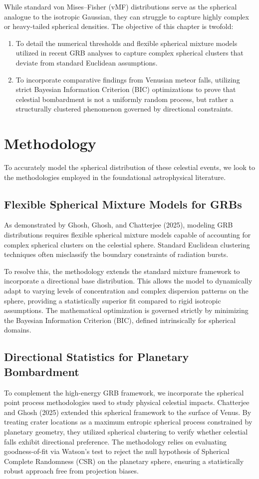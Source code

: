 \documentclass[12pt,a4paper]{report}
\begin{document}
While standard von Mises–Fisher (vMF) distributions serve as the spherical analogue to the isotropic Gaussian, they can struggle to capture highly complex or heavy-tailed spherical densities. The objective of this chapter is twofold:
\begin{enumerate}
    \item To detail the numerical thresholds and flexible spherical mixture models utilized in recent GRB analyses to capture complex spherical clusters that deviate from standard Euclidean assumptions.
    \item To incorporate comparative findings from Venusian meteor falls, utilizing strict Bayesian Information Criterion (BIC) optimizations to prove that celestial bombardment is not a uniformly random process, but rather a structurally clustered phenomenon governed by directional constraints.
\end{enumerate}

\section{Methodology}
To accurately model the spherical distribution of these celestial events, we look to the methodologies employed in the foundational astrophysical literature.

\subsection{Flexible Spherical Mixture Models for GRBs}
As demonstrated by Ghosh, Ghosh, and Chatterjee (2025), modeling GRB distributions requires flexible spherical mixture models capable of accounting for complex spherical clusters on the celestial sphere. Standard Euclidean clustering techniques often misclassify the boundary constraints of radiation bursts. 

To resolve this, the methodology extends the standard mixture framework to incorporate a directional base distribution. This allows the model to dynamically adapt to varying levels of concentration and complex dispersion patterns on the sphere, providing a statistically superior fit compared to rigid isotropic assumptions. The mathematical optimization is governed strictly by minimizing the Bayesian Information Criterion (BIC), defined intrinsically for spherical domains.

\subsection{Directional Statistics for Planetary Bombardment}
To complement the high-energy GRB framework, we incorporate the spherical point process methodologies used to study physical celestial impacts. Chatterjee and Ghosh (2025) extended this spherical framework to the surface of Venus. By treating crater locations as a maximum entropic spherical process constrained by planetary geometry, they utilized spherical clustering to verify whether celestial falls exhibit directional preference. The methodology relies on evaluating goodness-of-fit via Watson's test to reject the null hypothesis of Spherical Complete Randomness (CSR) on the planetary sphere, ensuring a statistically robust approach free from projection biases.
\end{document}
